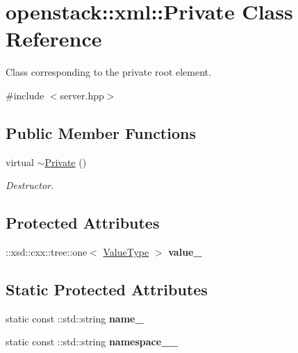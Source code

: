 \hypertarget{classopenstack_1_1xml_1_1Private}{
\section{openstack::xml::Private Class Reference}
\label{classopenstack_1_1xml_1_1Private}
}


Class corresponding to the private root element.  




{\ttfamily \#include $<$server.hpp$>$}

\subsection*{Public Member Functions}
\begin{DoxyCompactItemize}
\item 
\hypertarget{classopenstack_1_1xml_1_1Private_afd701bc0c206caaa0f914bf6b2886287}{
virtual \hyperlink{classopenstack_1_1xml_1_1Private_afd701bc0c206caaa0f914bf6b2886287}{$\sim$Private} ()}
\label{classopenstack_1_1xml_1_1Private_afd701bc0c206caaa0f914bf6b2886287}

\begin{DoxyCompactList}\small\item\em Destructor. \item\end{DoxyCompactList}\end{DoxyCompactItemize}
\subsection*{Protected Attributes}
\begin{DoxyCompactItemize}
\item 
\hypertarget{classopenstack_1_1xml_1_1Private_a57b6a3e472e585e5db0499b641e2a6ef}{
::xsd::cxx::tree::one$<$ \hyperlink{classopenstack_1_1xml_1_1AddressList}{ValueType} $>$ {\bfseries value\_\-}}
\label{classopenstack_1_1xml_1_1Private_a57b6a3e472e585e5db0499b641e2a6ef}

\end{DoxyCompactItemize}
\subsection*{Static Protected Attributes}
\begin{DoxyCompactItemize}
\item 
\hypertarget{classopenstack_1_1xml_1_1Private_a36e80a9374d90b1b9682a828979b8f79}{
static const ::std::string {\bfseries name\_\-}}
\label{classopenstack_1_1xml_1_1Private_a36e80a9374d90b1b9682a828979b8f79}

\item 
\hypertarget{classopenstack_1_1xml_1_1Private_ae029a76c1eae3487dc4fd16336df392b}{
static const ::std::string {\bfseries namespace\_\-\_\-}}
\label{classopenstack_1_1xml_1_1Private_ae029a76c1eae3487dc4fd16336df392b}

\end{DoxyCompactItemize}
